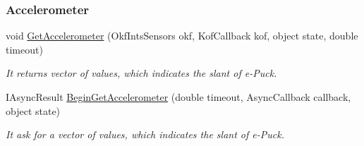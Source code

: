  \subsubsection*{Accelerometer} %
 \label{ssub:Accelerometer}
  \begin{DoxyCompactItemize}

  \item  void \hyperlink{class_elib_1_1_epuck_a87e5d0c07a8d2cc6909dabbc1a79ca1d}{GetAccelerometer} (OkfIntsSensors okf, KofCallback kof, object state, double timeout)
  \begin{DoxyCompactList}\small\item\em It returns vector of values, which indicates the slant of e-\/Puck. \item\end{DoxyCompactList}
  
  \item  IAsyncResult \hyperlink{class_elib_1_1_epuck_a6d09043fbbed47c089ad6f7cffa05e8c}{BeginGetAccelerometer} (double timeout, AsyncCallback callback, object state)
  \begin{DoxyCompactList}\small\item\em It ask for a vector of values, which indicates the slant of e-\/Puck. \item\end{DoxyCompactList}

  \end{DoxyCompactItemize}


